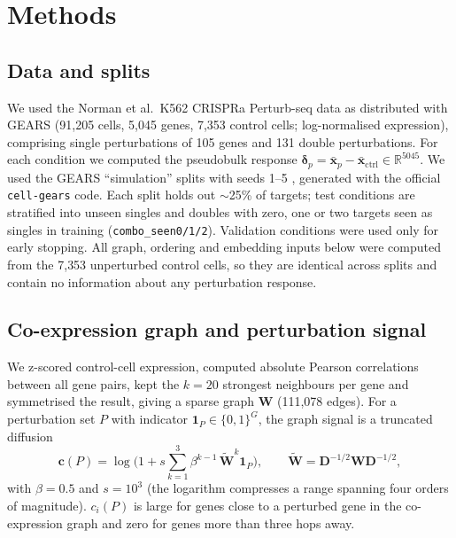 \section{Methods}

\subsection{Data and splits}
We used the Norman et al.\ K562 CRISPRa Perturb-seq data \citep{norman2019} as
distributed with GEARS (91{,}205 cells, 5{,}045 genes, 7{,}353 control cells;
log-normalised expression), comprising single perturbations of 105 genes and 131
double perturbations. For each condition we computed the
pseudobulk response $\boldsymbol{\delta}_p=\bar{\mathbf{x}}_p-\bar{\mathbf{x}}_{\mathrm{ctrl}}\in\mathbb{R}^{5045}$.
We used the GEARS ``simulation'' splits with seeds 1--5 \citep{roohani2024},
generated with the official \texttt{cell-gears} code. Each split holds out
$\sim$25\% of targets; test conditions are stratified into unseen singles and
doubles with zero, one or two targets seen as singles in training
(\texttt{combo\_seen0/1/2}). Validation conditions were used only for early
stopping. All graph, ordering and embedding inputs below were computed from the
7{,}353 unperturbed control cells, so they are identical across splits and
contain no information about any perturbation response.

\subsection{Co-expression graph and perturbation signal}
We z-scored control-cell expression, computed absolute Pearson correlations
between all gene pairs, kept the $k=20$ strongest neighbours per gene and
symmetrised the result, giving a sparse graph $\mathbf{W}$ (111{,}078 edges). For a
perturbation set $P$ with indicator $\mathbf{1}_P\in\{0,1\}^G$, the graph signal is
a truncated diffusion
\begin{equation}
\mathbf{c}(P)=\log\!\Big(1+s\sum_{k=1}^{3}\beta^{k-1}\,\widetilde{\mathbf{W}}^{k}\mathbf{1}_P\Big),
\qquad \widetilde{\mathbf{W}}=\mathbf{D}^{-1/2}\mathbf{W}\mathbf{D}^{-1/2},
\end{equation}
with $\beta=0.5$ and $s=10^{3}$ (the logarithm compresses a range spanning four
orders of magnitude). $c_i(P)$ is large for genes close to a perturbed gene in the
co-expression graph and zero for genes more than three hops away.

